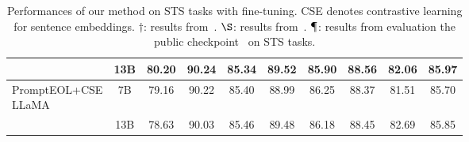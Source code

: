 \documentclass{article}
\begin{document}
\begin{table}[t]
{\begin{tabular}{lccccccccc}
 &\cellcolor{lightcyan}13B &\cellcolor{lightcyan}80.20 &\cellcolor{lightcyan}90.24 &\cellcolor{lightcyan}85.34 &\cellcolor{lightcyan}89.52 &\cellcolor{lightcyan}85.90 &\cellcolor{lightcyan}88.56 &\cellcolor{lightcyan}82.06 &\cellcolor{lightcyan}85.97\\
\midrule
\multirowcell{2}[0pt][l]{PromptEOL+CSE\\LLaMA}
& 7B & 79.16 & 90.22 & 85.40 & 88.99 & 86.25 & 88.37 & 81.51 & 85.70 \\
&\cellcolor{lightcyan}13B &\cellcolor{lightcyan}78.63 &\cellcolor{lightcyan}90.03 &\cellcolor{lightcyan}85.46 &\cellcolor{lightcyan}89.48 &\cellcolor{lightcyan}86.18 &\cellcolor{lightcyan}88.45 &\cellcolor{lightcyan}82.69 &\cellcolor{lightcyan}85.85 \\
\bottomrule
\end{tabular}
}
\caption{ Performances of our method on STS tasks with fine-tuning. CSE denotes contrastive learning for sentence embeddings.
  \(\dagger\): results from~\cite{gao2021simcse}.
  \(\S\): results from~\cite{sentencet5}.
  \( \mathparagraph \): results from evaluation the public checkpoint~\cite{muennighoff2022sgpt} on STS tasks.
}\label{tab:sts_w_ft}
\end{table}
\end{document}
